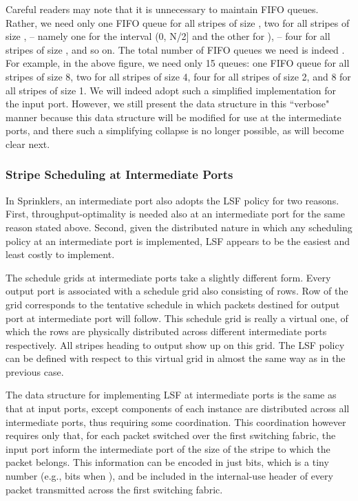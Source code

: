 Careful readers may note that it is unnecessary to maintain  FIFO queues.  Rather, we need only one FIFO queue for all 
stripes of size , two for all stripes of size , -- namely one for the interval (0, N/2] and the other for ), -- four for all stripes of size
, and so on.  The total number of FIFO queues we need is indeed .  
For example, in the above figure, we need only 15 queues: one FIFO queue for all stripes of size 8, two for all stripes of size 4, 
four for all stripes of size 2, and 8 for all stripes of size 1.  We will indeed adopt such a simplified implementation for the 
input port.  However, we still present the data structure in this ``verbose" manner because this data structure will be modified for use at
the intermediate ports, and there such a simplifying collapse is no longer possible, as will become clear next.








\subsubsection{Stripe Scheduling at Intermediate Ports}
\label{sec:scheduling intermediate}

In Sprinklers, an intermediate port also adopts the LSF policy for two reasons.  First, throughput-optimality is needed also at an intermediate port for the same reason stated above.  Second, given the distributed nature
in which any scheduling policy at an intermediate port is implemented, LSF 
appears to be the easiest and least costly to implement.


The schedule grids at intermediate ports take a slightly different form.
Every output port  is associated with a schedule grid also consisting of  rows. 
Row  of the grid corresponds to the tentative schedule in which packets destined for output port 
 at intermediate port  will follow.  This schedule grid is really a virtual one, of which the  rows are physically distributed across  different intermediate ports respectively.  All stripes heading to output 
 show up on this grid.  The LSF policy can be defined with respect to this virtual grid in 
almost the same way as in the previous case.  

The data structure for implementing LSF at intermediate ports is the same as that at input ports, except 
components of each instance are distributed across all  intermediate ports, thus requiring some 
coordination.  This coordination however requires only that, for each packet switched over the first switching fabric, 
the input port inform the intermediate port of the size of the stripe to which the packet belongs.  This 
information can be encoded in just  bits, which is a tiny number (e.g.,  bits 
when ), and be included in the internal-use header
of every packet transmitted across the first switching fabric.



